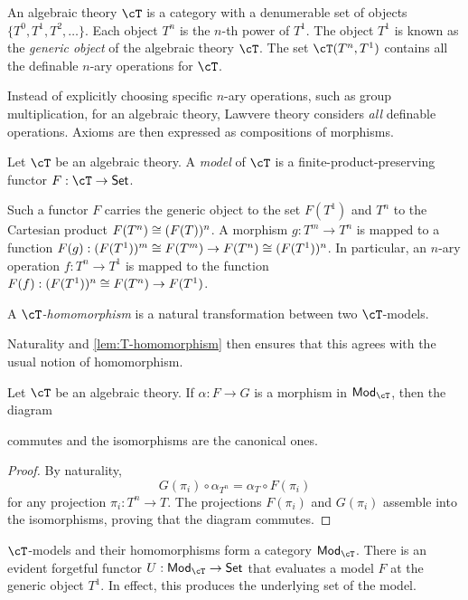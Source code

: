 \documentclass{amsart}
\begin{document}
\begin{defn}
  An algebraic theory $\cT$ is a category with a denumerable set of objects $\{T^{0}, T^{1}, T^{2}, \ldots\}$.
  Each object $T^{n}$ is the $n$-th power of $T^{1}$.
  The object $T^{1}$ is known as the \emph{generic object} of the algebraic theory $\cT$.
  The set $\cT(T^{n},T^{1})$ contains all the definable $n$-ary operations for $\cT$.
\end{defn}

Instead of explicitly choosing specific $n$-ary operations, such as group multiplication, for an algebraic theory, Lawvere theory considers \emph{all} definable operations.
Axioms are then expressed as compositions of morphisms.

\begin{defn}
  Let $\cT$ be an algebraic theory.
  A \emph{model} of $\cT$ is a finite-product-preserving functor $F : \cT \to \mathsf{Set}$.
\end{defn}

Such a functor $F$ carries the generic object to the set $F(T^{1})$ and $T^{n}$ to the Cartesian product $F(T^{n}) \cong (F(T))^{n}$.
A morphism $g : T^{m} \to T^{n}$ is mapped to a function $F(g) : (F(T^{1}))^{m} \cong F(T^{m}) \to F(T^{n}) \cong (F(T^{1}))^{n}$.
In particular, an $n$-ary operation $f : T^{n} \to T^{1}$ is mapped to the function $F(f) : (F(T^{1}))^{n} \cong F(T^{n}) \to F(T^{1})$.

\begin{defn}
  A \emph{$\cT$-homomorphism} is a natural transformation between two $\cT$-models.
\end{defn}

Naturality and \cref{lem:T-homomorphism} then ensures that this agrees with the usual notion of homomorphism.


\begin{lem}\label{lem:T-homomorphism}
  Let $\cT$ be an algebraic theory.
  If $\alpha : F \to G$ is a morphism in $\mathsf{Mod}_{\cT}$, then the diagram
  
  commutes and the isomorphisms are the canonical ones.
\end{lem}
\begin{proof}
  By naturality,
  \[
    G(\pi_{i}) \circ \alpha_{T^{n}} = \alpha_{T} \circ F(\pi_{i})
  \]
  for any projection $\pi_{i} : T^{n} \to T$.
  The projections $F(\pi_{i})$ and $G(\pi_{i})$ assemble into the isomorphisms, proving that the diagram commutes.
\end{proof}

$\cT$-models and their homomorphisms form a category $\mathsf{Mod}_{\cT}$.
There is an evident forgetful functor $U : \mathsf{Mod}_{\cT} \to \mathsf{Set}$ that evaluates a model $F$ at the generic object $T^{1}$.
In effect, this produces the underlying set of the model.
\end{document}
